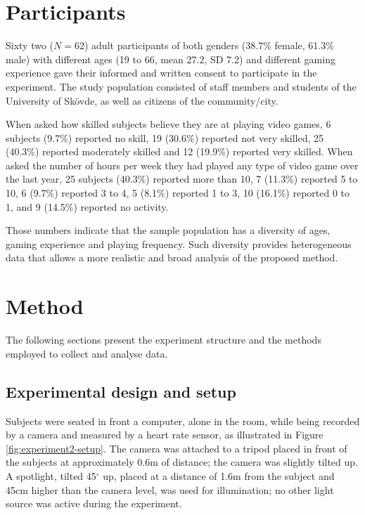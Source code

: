 \section{Participants}

Sixty two ($N=62$) adult participants of both genders (38.7\% female, 61.3\% male) with different ages (19 to 66, mean 27.2, SD 7.2) and different gaming experience gave their informed and written consent to participate in the experiment. The study population consisted of staff members and students of the University of Sk\"ovde, as well as citizens of the community/city.

When asked how skilled subjects believe they are at playing video games, 6 subjects (9.7\%) reported no skill, 19 (30.6\%) reported not very skilled, 25 (40.3\%) reported moderately skilled and 12 (19.9\%) reported very skilled. When asked the number of hours per week they had played any type of video game over the last year, 25 subjects (40.3\%) reported more than 10, 7 (11.3\%) reported 5 to 10, 6 (9.7\%) reported 3 to 4, 5 (8.1\%) reported 1 to 3, 10 (16.1\%) reported 0 to 1, and 9 (14.5\%) reported no activity.

Those numbers indicate that the sample population has a diversity of ages, gaming experience and playing frequency. Such diversity provides heterogeneous data that allows a more realistic and broad analysis of the proposed method.

\section{Method}
\label{sec:experiment2-method}

The following sections present the experiment structure and the methods employed to collect and analyse data.

\subsection{Experimental design and setup}

Subjects were seated in front a computer, alone in the room, while being recorded by a camera and measured by a heart rate sensor, as illustrated in Figure \ref{fig:experiment2-setup}. The camera was attached to a tripod placed in front of the subjects at approximately 0.6m of distance; the camera was slightly tilted up. A spotlight, tilted 45$^{\circ}$ up, placed at a distance of 1.6m from the subject and 45cm higher than the camera level, was used for illumination; no other light source was active during the experiment.

